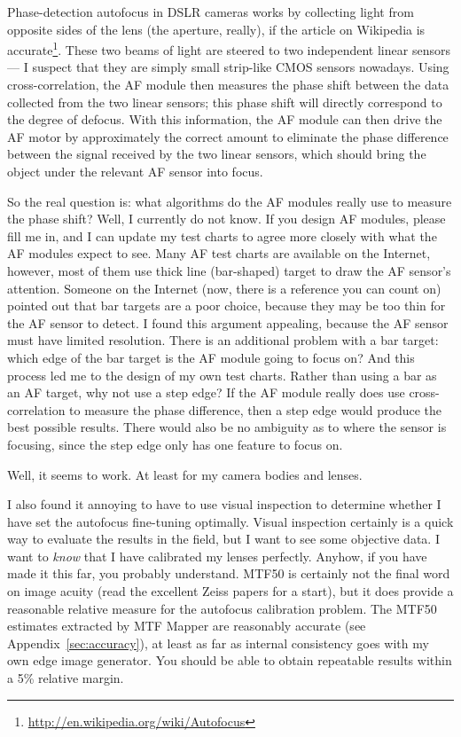 \documentclass[a4paper]{article}
\begin{document}
Phase-detection autofocus in DSLR cameras works by collecting light from
opposite sides of the lens (the aperture, really), if the article on
Wikipedia is
accurate\footnote{\url{http://en.wikipedia.org/wiki/Autofocus}}. These two
beams of light are steered to two independent linear sensors --- I suspect
that they are simply small strip-like CMOS sensors nowadays. Using
cross-correlation, the AF module then measures the phase shift between the
data collected from the two linear sensors; this phase shift will directly
correspond to the degree of defocus. With this information, the AF module
can then drive the AF motor by approximately the correct amount to
eliminate the phase difference between the signal received by the two
linear sensors, which should bring the object under the relevant AF sensor
into focus.

So the real question is: what algorithms do the AF modules really use to
measure the phase shift? Well, I currently do not know. If you design AF
modules, please fill me in, and I can update my test charts to agree more
closely with what the AF modules expect to see. Many AF test charts  are
available on the Internet, however, most of them use thick line (bar-shaped)
target to draw the AF sensor's attention. Someone on the Internet (now,
there is a reference you can count on) pointed out that bar targets are a
poor choice, because they may be too thin for the AF sensor to detect. I
found this argument appealing, because the AF sensor must have limited
resolution. There is an additional problem with a bar target: which edge of
the bar target is the AF module going to focus on? And this process led me
to the design of my own test charts. Rather than using a bar as an AF
target, why not use a step edge? If the AF module really does use
cross-correlation to measure the phase difference, then a step edge would
produce the best possible results. There would also be no ambiguity as to
where the sensor is focusing, since the step edge only has one feature to
focus on.

Well, it seems to work. At least for my camera bodies and lenses.

I also found it annoying to have to use visual inspection to determine
whether I have set the autofocus fine-tuning optimally. Visual
inspection certainly is a quick way to evaluate the results in the field, but I want to see some
objective data. I want to \emph{know} that I have calibrated my lenses
perfectly. Anyhow, if you have made it this far, you probably understand.
MTF50 is certainly not the final word on image acuity (read the excellent
Zeiss papers for a start), but it does provide a reasonable relative measure
for the autofocus calibration problem. The MTF50 estimates extracted by MTF
Mapper are reasonably accurate (see Appendix~\ref{sec:accuracy}), at least as
far as internal consistency goes with my own edge image generator. You should 
be able to obtain repeatable results within a 5\% relative margin.
\end{document}
